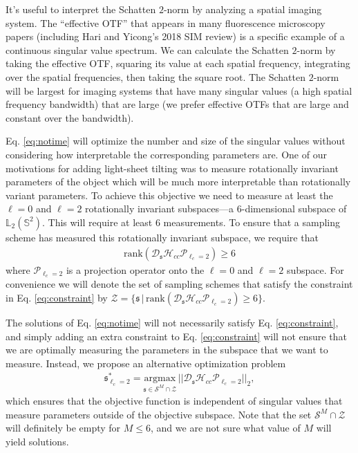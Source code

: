 \documentclass[11pt]{article}
\providecommand{\argmax}[1]{\underset{#1}{\mathrm{argmax}}\,}
\providecommand{\mc}[1]{\mathcal{#1}}
\providecommand{\mf}[1]{\mathfrak{#1}}
\providecommand{\mbb}[1]{\mathbb{#1}}
\begin{document}
It's useful to interpret the Schatten $2$-norm by analyzing a spatial imaging
system. The ``effective OTF'' that appears in many fluorescence microscopy
papers (including Hari and Yicong's 2018 SIM review) is a specific example of a
continuous singular value spectrum. We can calculate the Schatten $2$-norm by
taking the effective OTF, squaring its value at each spatial frequency,
integrating over the spatial frequencies, then taking the square root. The
Schatten $2$-norm will be largest for imaging systems that have many singular
values (a high spatial frequency bandwidth) that are large (we prefer effective
OTFs that are large and constant over the bandwidth). 

Eq. \eqref{eq:notime} will optimize the number and size of the singular values
without considering how interpretable the corresponding parameters are. One of
our motivations for adding light-sheet tilting was to measure rotationally
invariant parameters of the object which will be much more interpretable than
rotationally variant parameters. To achieve this objective we need to measure at
least the $\ell=0$ and $\ell = 2$ rotationally invariant subspaces---a
6-dimensional subspace of $\mbb{L}_2(\mbb{S}^2)$. This will require at least 6
measurements. To ensure that a sampling scheme has measured this rotationally
invariant subspace, we require that
\begin{align}
  \text{rank}(\mc{D}_{\mf{s}}\mc{H}_{cc}\mc{P}_{\ell_c = 2}) \geq 6 \label{eq:constraint}
\end{align}
where $\mc{P}_{\ell_c=2}$ is a projection operator onto the $\ell=0$ and
$\ell=2$ subspace. For convenience we will denote the set of sampling schemes
that satisfy the constraint in Eq. \eqref{eq:constraint} by
$\mc{Z} = \{\mf{s}\, |\, \text{rank}(\mc{D}_{\mf{s}}\mc{H}_{cc}\mc{P}_{\ell_c = 2})
\geq 6\}$.

The solutions of Eq. \eqref{eq:notime} will not necessarily satisfy Eq.
\eqref{eq:constraint}, and simply adding an extra constraint to Eq.
\eqref{eq:constraint} will not ensure that we are optimally measuring the
parameters in the subspace that we want to measure. Instead, we propose an
alternative optimization problem
\begin{align}
    \mf{s}_{\ell_c =2}^* = \argmax{\mf{s} \in \mc{S}^M\cap\mc{Z}}||\mc{D}_{\mf{s}}\mc{H}_{cc}\mc{P}_{\ell_c = 2}||_2,
\end{align}
which ensures that the objective function is independent of singular values that
measure parameters outside of the objective subspace. Note that the set
$\mc{S}^M\cap\mc{Z}$ will definitely be empty for $M \leq 6$, and we are not sure
what value of $M$ will yield solutions.
\end{document}
